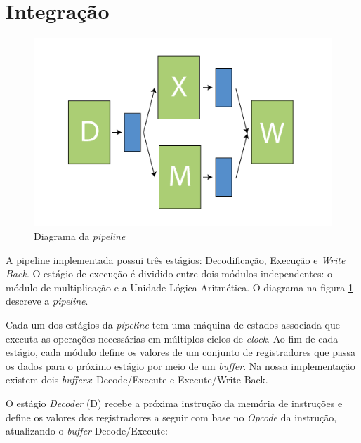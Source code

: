 \documentclass[11pt,a4paper,titlepage]{article}
\begin{document}
\section{Integração}

\begin{figure}[!h]
\centering
\includegraphics[scale=0.5]{images/pipeline_diagram.png}
\caption{Diagrama da \textit{pipeline}}
\label{fig:pipeline_diagram}
\end{figure}

A pipeline implementada possui três estágios: Decodificação, Execução e \textit{Write Back}.
O estágio de execução é dividido entre dois módulos independentes: o módulo de multiplicação e a 
Unidade Lógica Aritmética. O diagrama na figura \ref{fig:pipeline_diagram} descreve a \textit{pipeline}.

Cada um dos estágios da \textit{pipeline} tem uma máquina de estados associada que executa as operações
necessárias em múltiplos ciclos de \textit{clock}. Ao fim de cada estágio, cada módulo
define os valores de um conjunto de registradores que passa os dados para o próximo estágio por
meio de um \textit{buffer}. Na nossa implementação existem dois \textit{buffers}: Decode/Execute
e Execute/Write Back.

O estágio \textit{Decoder} (D) recebe a próxima instrução da memória de instruções e define 
os valores dos registradores a seguir com base no \textit{Opcode} da instrução, atualizando
o \textit{buffer} Decode/Execute:
\end{document}
